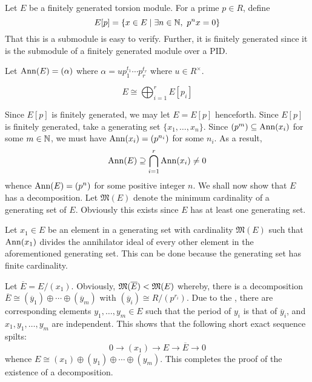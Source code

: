 Let $E$ be a finitely generated torsion module. For a prime $p\in R$, define
\begin{equation*}
    E[p] = \{x\in E\mid\exists n\in\mathbb{N},~p^nx = 0\}
\end{equation*}
That this is a submodule is easy to verify. Further, it is finitely generated since it is the submodule of a finitely generated module over a PID. 

Let $\operatorname{Ann}(E) = (\alpha)$ where $\alpha = up_1^{t_1}\cdots p_r^{t_r}$ where $u\in R^\times$.

\begin{lemma}
    \begin{equation*}
        E\cong\bigoplus_{i = 1}^r E[p_i]
    \end{equation*}
\end{lemma}

Since $E[p]$ is finitely generated, we may let $E = E[p]$ henceforth. Since $E[p]$ is finitely generated, take a generating set $\{x_1,\ldots,x_n\}$. Since $(p^m)\subseteq\operatorname{Ann}(x_i)$ for some $m\in\mathbb{N}$, we must have $\operatorname{Ann}(x_i) = (p^{n_i})$ for some $n_i$. As a result, 
\begin{equation*}
    \operatorname{Ann}(E)\supseteq\bigcap_{i = 1}^r\operatorname{Ann}(x_i)\ne 0
\end{equation*}
whence $\operatorname{Ann}(E) = (p^{n})$ for some positive integer $n$. We shall now show that $E$ has a decomposition. Let $\mathfrak M(E)$ denote the minimum cardinality of a generating set of $E$. Obviously this exists since $E$ has at least one generating set.

Let $x_1\in E$ be an element in a generating set with cardinality $\mathfrak M(E)$ such that $\operatorname{Ann}(x_1)$ divides the annihilator ideal of every other element in the aforementioned generating set. This can be done because the generating set has finite cardinality. 

Let $\overline E = E/(x_1)$. Obviously, $\mathfrak{M}(\overline E) < \mathfrak{M}(E)$ whereby, there is a decomposition $\overline E\cong (\overline y_1)\oplus\cdots\oplus(\overline y_m)$ with $(\overline y_i)\cong R/(p^{r_i})$. Due to the , there are corresponding elements $y_1,\ldots,y_m\in E$ such that the period of $y_i$ is that of $\overline y_i$, and $x_1,y_1,\ldots,y_m$ are independent. This shows that the following short exact sequence spilts: 
\begin{equation*}
    0\rightarrow(x_1)\rightarrow E\rightarrow\overline E\rightarrow 0
\end{equation*}
whence $E\cong(x_1)\oplus(y_1)\oplus\cdots\oplus(y_m)$. This completes the proof of the existence of a decomposition.

